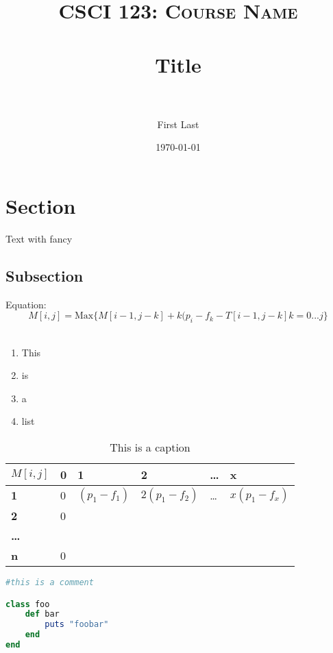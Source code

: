 \documentclass{article}
\title{
	\normalfont \normalsize \textsc{CSCI 123: Course Name} \\ [25pt]
	\horrule{0.5pt} \\[0.4cm]
	\huge Title \\
	\horrule{2pt} \\[0.5cm]
}
\date{\today}
\author{
	First Last
	\vspace{.5in}
}
\begin{document}
\maketitle
\clearpage

\section{Section}
Text with fancy \LaTeXe

\subsection{Subsection}
Equation: \\
\begin{equation}
M[i,j]=\textrm{Max} \{M[i-1,j-k]+k(p_i-f_k-T[i-1,j-k]     k=0...j\}
\end{equation} \\

\begin{enumerate}
\item This
\item is
\item a
\item[] list %
\end{enumerate}

\begin{table}[H]
\begin{tabular}{|l|l|l|l|l|l|}
\hline
\textbf{$M[i,j]$}      & \textbf{0} & \textbf{1}    & \textbf{2}     & \textbf{\ldots} & \textbf{x}     \\ \hline
\textbf{1}      & 0          & $(p_1 - f_1)$ & $2(p_1 - f_2)$ & \ldots          & $x(p_1 - f_x)$ \\ \hline
\textbf{2}      & 0          &               &                &                 &                \\ \hline
\textbf{\ldots} &            &               &                &                 &                \\ \hline
\textbf{n}      & 0          &               &                &                 &                \\ \hline
\end{tabular}
\caption{This is a caption}
\end{table}

\begin{lstlisting}[language=Ruby, caption=Ruby snippet]
#this is a comment

class foo
	def bar
		puts "foobar"
	end
end

\end{lstlisting}
\end{document}
